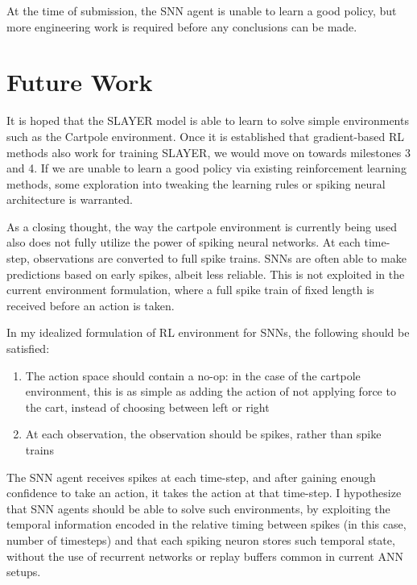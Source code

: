\documentclass[fyp]{socreport}
\begin{document}
At the time of submission, the SNN agent is unable to learn a good policy, but
more engineering work is required before any conclusions can be made.

\section{Future Work}

It is hoped that the SLAYER model is able to learn to solve simple environments
such as the Cartpole environment. Once it is established that gradient-based RL
methods also work for training SLAYER, we would move on towards milestones 3 and
4. If we are unable to learn a good policy via existing reinforcement learning
methods, some exploration into tweaking the learning rules or spiking neural
architecture is warranted.

As a closing thought, the way the cartpole environment is currently being used
also does not fully utilize the power of spiking neural networks. At each
time-step, observations are converted to full spike trains. SNNs are often able
to make predictions based on early spikes, albeit less reliable. This is not
exploited in the current environment formulation, where a full spike train of
fixed length is received before an action is taken.

In my idealized formulation of RL environment for SNNs, the following should be
satisfied:

\begin{enumerate}
  \item The action space should contain a no-op: in the case of the cartpole
  environment, this is as simple as adding the action of not applying force to
  the cart, instead of choosing between left or right
\item At each observation, the observation should be spikes, rather than spike
trains
\end{enumerate}

The SNN agent receives spikes at each time-step, and after gaining enough
confidence to take an action, it takes the action at that time-step. I
hypothesize that SNN agents should be able to solve such environments, by
exploiting the temporal information encoded in the relative timing between
spikes (in this case, number of timesteps) and that each spiking neuron stores
such temporal state, without the use of recurrent networks or replay buffers
common in current ANN setups.



\appendix
\end{document}
